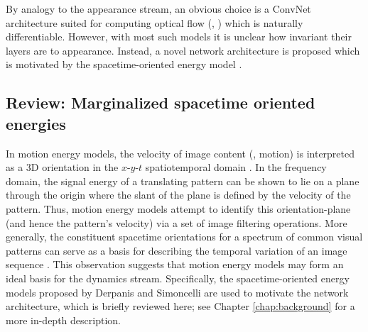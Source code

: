 By analogy to the appearance stream, an obvious choice
is a ConvNet architecture suited for computing
optical flow  (\eg, \cite{dosovitskiy2015,ilg2017}) which
is naturally differentiable.
However, with most such models it is unclear how invariant
their layers are to appearance.
Instead, a novel network architecture is proposed which is
motivated by the spacetime-oriented energy model
\cite{derpanis2012spacetime,simoncelli1998}. 

\subsection{Review: Marginalized spacetime oriented energies}

In motion energy models, the velocity of image content (\ie, motion)
is interpreted as a 3D orientation in the $x$-$y$-$t$
spatiotemporal domain
\cite{adelson1985spatiotemporal,fahle1981,heeger1988,simoncelli1998,watson1983}. 
In the frequency domain, the signal energy of a translating
pattern can be shown to lie on a plane through the origin
where the slant of the plane is defined by the velocity of
the  pattern. 
Thus, motion energy models attempt to identify this 
orientation-plane (and hence the pattern's velocity) via
a set of image filtering operations.
More generally,
the constituent
spacetime orientations for a spectrum of common
visual patterns can serve as a basis for describing the temporal
variation of an image sequence \cite{derpanis2012spacetime}.
This observation suggests that motion energy models may form an
ideal basis for the dynamics stream. Specifically, the spacetime-oriented energy models proposed by Derpanis \etal \cite{derpanis2012spacetime}
and Simoncelli \etal \cite{simoncelli1998} are used to motivate the
network architecture, which is briefly reviewed here; 
see Chapter \ref{chap:background}  for a more in-depth description.

